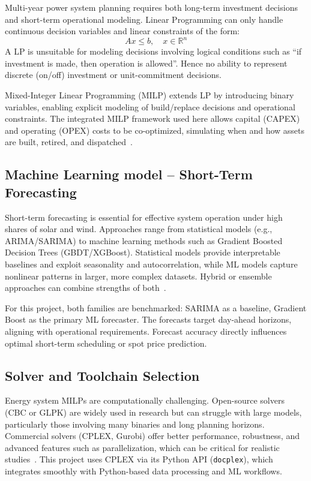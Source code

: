 Multi-year power system planning requires both long-term investment decisions and short-term 
operational modeling. Linear Programming can only handle continuous decision variables and linear 
constraints of the form:
\[
Ax \leq b, \quad x \in \mathbb{R}^n
\]
A LP is unsuitable for modeling decisions involving logical conditions such as “if investment is made, 
then operation is allowed”. Hence no ability to represent discrete (on/off) investment or unit-commitment 
decisions. 

Mixed-Integer Linear Programming (MILP) extends LP by introducing binary variables, enabling explicit 
modeling of build/replace decisions and operational constraints. The integrated MILP framework used 
here allows capital (CAPEX) and operating (OPEX) costs to be co-optimized, simulating when and how 
assets are built, retired, and dispatched~\cite{andersson2004power, wood2013power}.


\subsection{Machine Learning model -- Short-Term Forecasting}

Short-term forecasting is essential for effective system operation under high shares of solar and 
wind. Approaches range from statistical models (e.g., ARIMA/SARIMA) to machine learning 
methods such as Gradient Boosted Decision Trees (GBDT/XGBoost). Statistical 
models provide interpretable baselines and exploit seasonality and autocorrelation, while ML models 
capture nonlinear patterns in larger, more complex datasets. Hybrid or ensemble approaches can 
combine strengths of both~\cite{grzebyk2021xgboost, zhong2020xgboost}.

For this project, both families are benchmarked: SARIMA as a baseline, Gradient Boost as the primary ML 
forecaster. The forecasts target day-ahead horizons, aligning with operational requirements. 
Forecast accuracy directly influences optimal short-term scheduling or spot price prediction.

\subsection{Solver and Toolchain Selection}

Energy system MILPs are computationally challenging. Open-source solvers (CBC or GLPK) are widely 
used in research but can struggle with large models, particularly those involving many binaries and 
long planning horizons. Commercial solvers (CPLEX, Gurobi) offer better performance, robustness, and 
advanced features such as parallelization, which can be critical for realistic 
studies~\cite{mittelmann2023benchmarks}. This project uses CPLEX via its Python API 
(\texttt{docplex}), which integrates smoothly with Python-based data processing and ML workflows.


